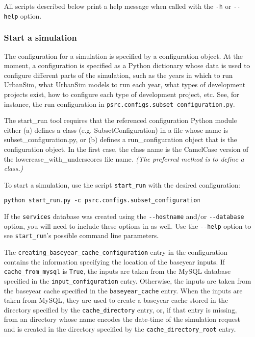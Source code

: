 All scripts described below print a help message when called with the
\verb|-h| or \verb|--help| option.

\subsubsection{Start a simulation}
The configuration for a simulation is specified by a configuration object. At
the moment, a configuration is specified as a Python \pythonindex dictionary whose data is
used to configure different parts of the simulation, such as the years in
which to run UrbanSim, what UrbanSim models \modelsindex to run each year, what types of
development projects exist, how to configure each type of development project,
etc. See, for instance, the run configuration in
\verb|psrc.configs.subset_configuration.py|.

The start_run tool requires that the referenced configuration Python module
either (a) defines a class (e.g. SubsetConfiguration) in a file whose name is
subset_configuration.py, or (b) defines a run_configuration object that is
the configuration object.  In the first case, the class name is the CamelCase
version of the lowercase_with_underscores file name.  \emph{(The preferred
method is to define a class.)} 

To start a simulation, use the script \verb|start_run| with the desired
configuration:
\pythonindex
\begin{verbatim}
python start_run.py -c psrc.configs.subset_configuration
\end{verbatim}

If the \verb|services| database was created using the \verb|--hostname| and/or
\verb|--database| option, you will need to include these options in
 as well.  Use the \verb|--help| option to see
\verb|start_run|'s possible command line parameters.

The \verb|creating_baseyear_cache_configuration| entry in the configuration
contains the information specifying the location of the baseyear inputs.  
If \verb|cache_from_mysql| is \verb|True|, the inputs are taken from
the MySQL database specified in the \verb|input_configuration| entry. 
Otherwise, the inputs are taken from the baseyear cache specified in the
\verb|baseyear_cache| entry.  When the inputs are taken from MySQL, they are
used to create a baseyear cache stored in the directory specified by the
\verb|cache_directory| entry, or, if that entry is missing, from an directory
whose name encodes the date-time of the simulation request and is created in the
directory specified by the \verb|cache_directory_root| entry.  

